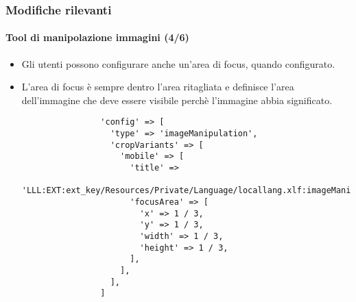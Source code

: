 \begin{frame}[fragile]
	\frametitle{Modifiche rilevanti}
	\framesubtitle{Tool di manipolazione immagini (4/6)}

	\lstset{basicstyle=\tiny\ttfamily}

	\begin{itemize}
		\item Gli utenti possono configurare anche un'area di focus, quando configurato.
		\item L'area di focus è sempre dentro l'area ritagliata e definisce l'area dell'immagine
			che deve essere visibile perchè l'immagine abbia significato.

			\begin{lstlisting}
				'config' => [
				  'type' => 'imageManipulation',
				  'cropVariants' => [
				    'mobile' => [
				      'title' =>
				        'LLL:EXT:ext_key/Resources/Private/Language/locallang.xlf:imageManipulation.mobile',
				      'focusArea' => [
				        'x' => 1 / 3,
				        'y' => 1 / 3,
				        'width' => 1 / 3,
				        'height' => 1 / 3,
				      ],
				    ],
				  ],
				]
			\end{lstlisting}

	\end{itemize}

\end{frame}


